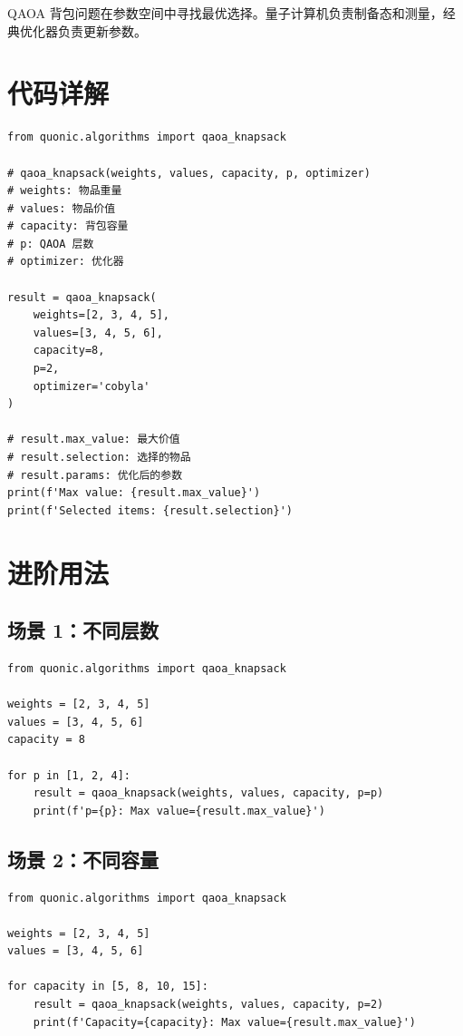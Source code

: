 \documentclass[12pt,a4paper]{article}
\begin{document}
QAOA 背包问题在参数空间中寻找最优选择。量子计算机负责制备态和测量，经典优化器负责更新参数。

\section{代码详解}

\begin{verbatim}
from quonic.algorithms import qaoa_knapsack

# qaoa_knapsack(weights, values, capacity, p, optimizer)
# weights: 物品重量
# values: 物品价值
# capacity: 背包容量
# p: QAOA 层数
# optimizer: 优化器

result = qaoa_knapsack(
    weights=[2, 3, 4, 5],
    values=[3, 4, 5, 6],
    capacity=8,
    p=2,
    optimizer='cobyla'
)

# result.max_value: 最大价值
# result.selection: 选择的物品
# result.params: 优化后的参数
print(f'Max value: {result.max_value}')
print(f'Selected items: {result.selection}')
\end{verbatim}

\section{进阶用法}

\subsection{场景 1：不同层数}

\begin{verbatim}
from quonic.algorithms import qaoa_knapsack

weights = [2, 3, 4, 5]
values = [3, 4, 5, 6]
capacity = 8

for p in [1, 2, 4]:
    result = qaoa_knapsack(weights, values, capacity, p=p)
    print(f'p={p}: Max value={result.max_value}')
\end{verbatim}

\subsection{场景 2：不同容量}

\begin{verbatim}
from quonic.algorithms import qaoa_knapsack

weights = [2, 3, 4, 5]
values = [3, 4, 5, 6]

for capacity in [5, 8, 10, 15]:
    result = qaoa_knapsack(weights, values, capacity, p=2)
    print(f'Capacity={capacity}: Max value={result.max_value}')
\end{verbatim}
\end{document}
